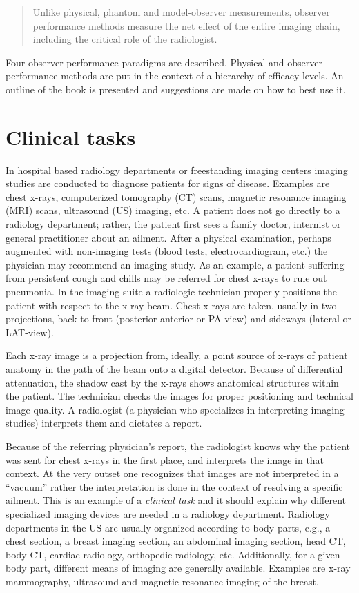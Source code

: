 \documentclass[
]{book}
\begin{document}
\begin{quote}
Unlike physical, phantom and model-observer measurements, observer performance methods measure the net effect of the entire imaging chain, including the critical role of the radiologist.
\end{quote}

Four observer performance paradigms are described. Physical and observer performance methods are put in the context of a hierarchy of efficacy levels. An outline of the book is presented and suggestions are made on how to best use it.

\hypertarget{clinical-tasks}{%
\section{Clinical tasks}\label{clinical-tasks}}

In hospital based radiology departments or freestanding imaging centers imaging studies are conducted to diagnose patients for signs of disease. Examples are chest x-rays, computerized tomography (CT) scans, magnetic resonance imaging (MRI) scans, ultrasound (US) imaging, etc. A patient does not go directly to a radiology department; rather, the patient first sees a family doctor, internist or general practitioner about an ailment. After a physical examination, perhaps augmented with non-imaging tests (blood tests, electrocardiogram, etc.) the physician may recommend an imaging study. As an example, a patient suffering from persistent cough and chills may be referred for chest x-rays to rule out pneumonia. In the imaging suite a radiologic technician properly positions the patient with respect to the x-ray beam. Chest x-rays are taken, usually in two projections, back to front (posterior-anterior or PA-view) and sideways (lateral or LAT-view).

Each x-ray image is a projection from, ideally, a point source of x-rays of patient anatomy in the path of the beam onto a digital detector. Because of differential attenuation, the shadow cast by the x-rays shows anatomical structures within the patient. The technician checks the images for proper positioning and technical image quality. A radiologist (a physician who specializes in interpreting imaging studies) interprets them and dictates a report.

Because of the referring physician's report, the radiologist knows why the patient was sent for chest x-rays in the first place, and interprets the image in that context. At the very outset one recognizes that images are not interpreted in a ``vacuum'' rather the interpretation is done in the context of resolving a specific ailment. This is an example of a \emph{clinical task} and it should explain why different specialized imaging devices are needed in a radiology department. Radiology departments in the US are usually organized according to body parts, e.g., a chest section, a breast imaging section, an abdominal imaging section, head CT, body CT, cardiac radiology, orthopedic radiology, etc. Additionally, for a given body part, different means of imaging are generally available. Examples are x-ray mammography, ultrasound and magnetic resonance imaging of the breast.
\end{document}
